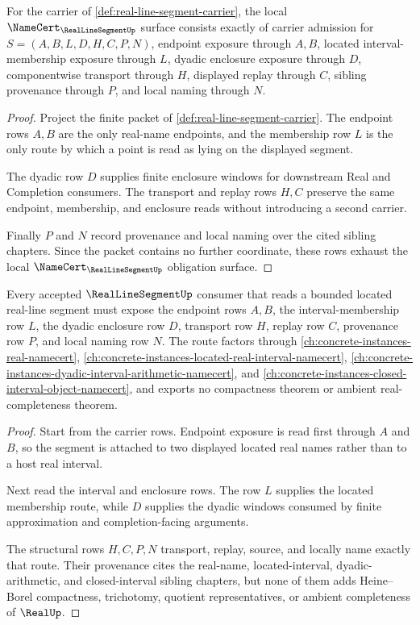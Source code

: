 \begin{theorem}
\label{thm:real-line-segment-namecert-obligations}
For the carrier of \autoref{def:real-line-segment-carrier}, the local $\NameCert_{\RealLineSegmentUp}$ surface consists exactly of carrier admission for $S=(A,B,L,D,H,C,P,N)$, endpoint exposure through $A,B$, located interval-membership exposure through $L$, dyadic enclosure exposure through $D$, componentwise transport through $H$, displayed replay through $C$, sibling provenance through $P$, and local naming through $N$.
\end{theorem}
\begin{proof}
Project the finite packet of \autoref{def:real-line-segment-carrier}. The endpoint rows $A,B$ are the only real-name endpoints, and the membership row $L$ is the only route by which a point is read as lying on the displayed segment.

The dyadic row $D$ supplies finite enclosure windows for downstream Real and Completion consumers. The transport and replay rows $H,C$ preserve the same endpoint, membership, and enclosure reads without introducing a second carrier.

Finally $P$ and $N$ record provenance and local naming over the cited sibling chapters. Since the packet contains no further coordinate, these rows exhaust the local $\NameCert_{\RealLineSegmentUp}$ obligation surface.
\end{proof}

\begin{theorem}
\label{thm:real-line-segment-located-interval-route}
Every accepted $\RealLineSegmentUp$ consumer that reads a bounded located real-line segment must expose the endpoint rows $A,B$, the interval-membership row $L$, the dyadic enclosure row $D$, transport row $H$, replay row $C$, provenance row $P$, and local naming row $N$. The route factors through \autoref{ch:concrete-instances-real-namecert}, \autoref{ch:concrete-instances-located-real-interval-namecert}, \autoref{ch:concrete-instances-dyadic-interval-arithmetic-namecert}, and \autoref{ch:concrete-instances-closed-interval-object-namecert}, and exports no compactness theorem or ambient real-completeness theorem.
\end{theorem}
\begin{proof}
Start from the carrier rows. Endpoint exposure is read first through $A$ and $B$, so the segment is attached to two displayed located real names rather than to a host real interval.

Next read the interval and enclosure rows. The row $L$ supplies the located membership route, while $D$ supplies the dyadic windows consumed by finite approximation and completion-facing arguments.

The structural rows $H,C,P,N$ transport, replay, source, and locally name exactly that route. Their provenance cites the real-name, located-interval, dyadic-arithmetic, and closed-interval sibling chapters, but none of them adds Heine--Borel compactness, trichotomy, quotient representatives, or ambient completeness of $\RealUp$.
\end{proof}

